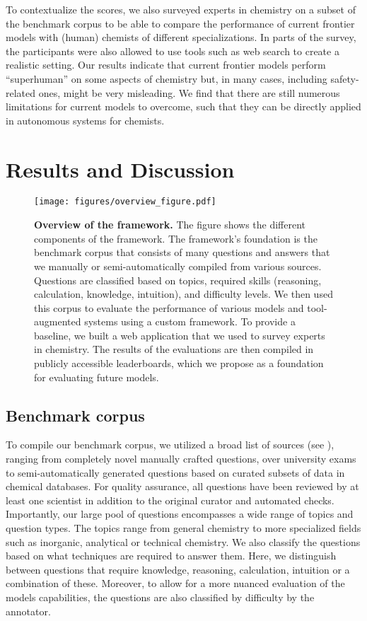 \documentclass[11pt, oneside]{article}
\begin{document}
\begin{refsection}
To contextualize the scores, we also surveyed  experts in chemistry on a subset of the benchmark corpus to be able to compare the performance of current frontier models with (human) chemists of different specializations. In parts of the survey, the participants were also allowed to use tools such as web search to create a realistic setting.
Our results indicate that current frontier models perform \enquote{superhuman} on some aspects of chemistry but, in many cases, including safety-related ones, might be very misleading.
We find that there are still numerous limitations for current models to overcome, such that they can be directly applied in autonomous systems for chemists.

\section{Results and Discussion}

\begin{figure}
    \texttt{[image: figures/overview\_figure.pdf]}
    \caption{\textbf{Overview of the \chembench framework.} The figure shows the different components of the \chembench framework. 
    The framework's foundation is the benchmark corpus that consists of many questions and answers that we manually or semi-automatically compiled from various sources.
    Questions are classified based on topics, required skills (reasoning, calculation, knowledge, intuition), and difficulty levels.
    We then used this corpus to evaluate the performance of various models and tool-augmented systems using a custom framework. To provide a baseline, we built a web application that we used to survey experts in chemistry.
    The results of the evaluations are then compiled in publicly accessible leaderboards, which we propose as a foundation for evaluating future models.
    }
    \label{fig:overview_figure}
\end{figure}

\subsection{Benchmark corpus}

To compile our benchmark corpus, we utilized a broad list of sources (see ), ranging from completely novel manually crafted questions, over university exams to semi-automatically generated questions based on curated subsets of data in chemical databases.
For quality assurance, all questions have been reviewed by at least one scientist in addition to the original curator and automated checks. 
Importantly, our large pool of questions encompasses a wide range of topics and question types. The topics range from general chemistry to more specialized fields such as inorganic, analytical or technical chemistry. 
We also classify the questions based on what techniques are required to answer them. Here, we distinguish between questions that require knowledge, reasoning, calculation, intuition or a combination of these.
Moreover, to allow for a more nuanced evaluation of the models capabilities, the questions are also classified by difficulty by the annotator.


\end{refsection}
\end{document}
